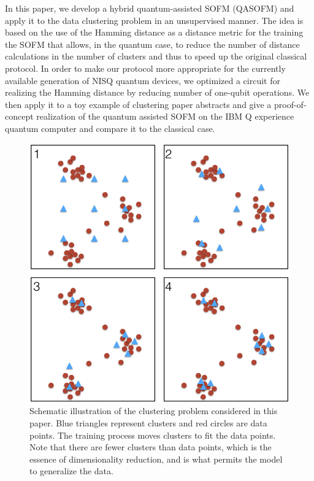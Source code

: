 \documentclass[pra,showkeys,twocolumn,showpacs]{revtex4-1}
\begin{document}
In this paper, we develop a hybrid quantum-assisted SOFM (QASOFM)
and apply it to the data clustering problem in an unsupervised manner. The idea is based on the use of the Hamming distance as a distance metric for the training the SOFM that allows, in the quantum case, to reduce the number of distance calculations in the number of clusters and thus to speed up the original classical protocol.
In order to make our protocol more appropriate for the currently available generation of NISQ quantum devices, we optimized a circuit for realizing the Hamming distance by reducing number of one-qubit operations. We then apply it to a toy example of clustering paper abstracts and give a proof-of-concept realization of the quantum assisted SOFM on the IBM Q experience quantum computer \cite{ibmq}
and compare it to the classical case.

\begin{figure}
  	\includegraphics[width=0.95\columnwidth]{sofm_fitting.png}
	\caption{
		Schematic illustration of the clustering problem considered in this paper.
		Blue triangles represent clusters and red circles are data points.
		The training process moves clusters to fit the data points.
		Note that there are fewer clusters than data points,
		which is the essence of dimensionality reduction,
		and is what permits the model to generalize the data.
	}
	\label{fig:sofm_fitting}
\end{figure}
\end{document}
